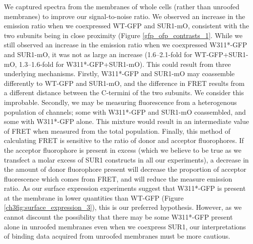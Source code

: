 We captured spectra from the membranes of whole cells (rather than unroofed membranes) to improve our signal-to-noise ratio.
We observed an increase in the emission ratio when we coexpressed WT-GFP and SUR1-mO, consistent with the two subunits being in close proximity (Figure \ref{gfp_ofp_contrasts_1}.
While we still observed an increase in the emission ratio when we coexpressed W311*-GFP and SUR1-mO, it was not as large an increase (\numrange{1.6}{2.1}-fold for WT-GFP+SUR1-mO, \numrange{1.3}{1.6}-fold for W311*-GFP+SUR1-mO).
This could result from three underlying mechanisms.
Firstly, W311*-GFP and SUR1-mO may coassemble differently to WT-GFP and SUR1-mO, and the difference in FRET results from a different distance between the C-termini of the two subunits.
We consider this improbable.
Secondly, we may be measuring fluorescence from a heterogenous population of channels; some with W311*-GFP and SUR1-mO coassembled, and some with W311*-GFP alone.
This mixture would result in an intermediate value of FRET when measured from the total population.
Finally, this method of calculating FRET is sensitive to the ratio of donor and acceptor fluorophores.
If the acceptor fluorophore is present in excess (which we believe to be true as we transfect a molar excess of SUR1 constructs in all our experiments), a decrease in the amount of donor fluorophore present will decrease the proportion of acceptor fluorescence which comes from FRET, and will reduce the measure emission ratio.
As our surface expression experiments suggest that W311*-GFP is present at the membrane in lower quantities than WT-GFP (Figure \ref{ch3fig:surface_expression_3}), this is our preferred hypothesis.
However, as we cannot discount the possibility that there may be some W311*-GFP present alone in unroofed membranes even when we coexpress SUR1, our interpretations of binding data acquired from unroofed membranes must be more cautious.

